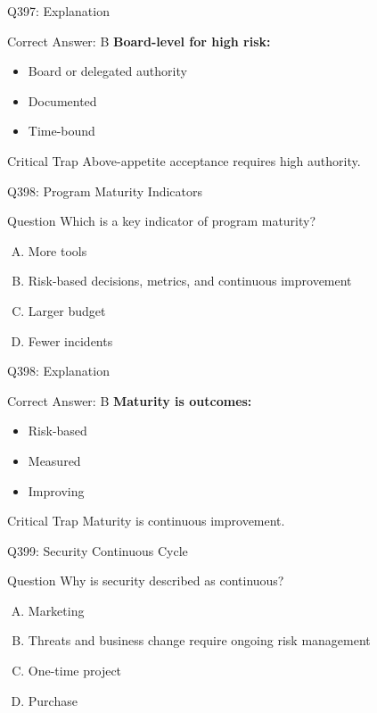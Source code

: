 \documentclass{beamer}
\begin{document}
	\begin{frame}{Q397: Explanation}
		\begin{block}{Correct Answer: B}
			\textbf{Board-level for high risk:}
			\begin{itemize}
				\item Board or delegated authority
				\item Documented
				\item Time-bound
			\end{itemize}
		\end{block}
		\begin{alertblock}{Critical Trap}
			Above-appetite acceptance requires high authority.
		\end{alertblock}
	\end{frame}
	
	\begin{frame}{Q398: Program Maturity Indicators}
		\begin{block}{Question}
			Which is a key indicator of program maturity?
		\end{block}
		\begin{enumerate}[(A)]
			\item More tools
			\item Risk-based decisions, metrics, and continuous improvement
			\item Larger budget
			\item Fewer incidents
		\end{enumerate}
	\end{frame}
	
	\begin{frame}{Q398: Explanation}
		\begin{block}{Correct Answer: B}
			\textbf{Maturity is outcomes:}
			\begin{itemize}
				\item Risk-based
				\item Measured
				\item Improving
			\end{itemize}
		\end{block}
		\begin{alertblock}{Critical Trap}
			Maturity is continuous improvement.
		\end{alertblock}
	\end{frame}
	
	\begin{frame}{Q399: Security Continuous Cycle}
		\begin{block}{Question}
			Why is security described as continuous?
		\end{block}
		\begin{enumerate}[(A)]
			\item Marketing
			\item Threats and business change require ongoing risk management
			\item One-time project
			\item Purchase
		\end{enumerate}
	\end{frame}
	
\end{document}
